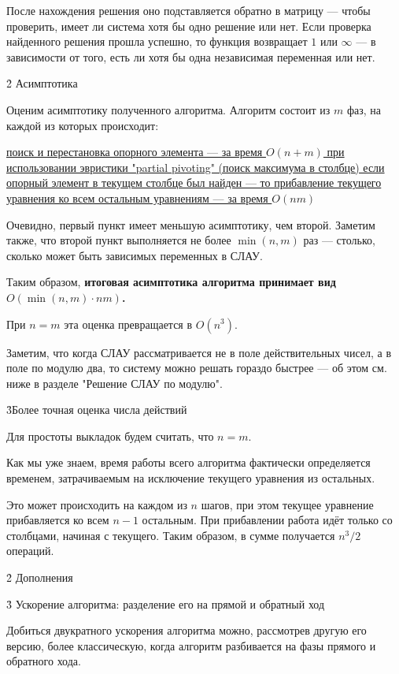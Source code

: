 После нахождения решения оно подставляется обратно в матрицу --- чтобы проверить, имеет ли система хотя бы одно решение или нет. Если проверка найденного решения прошла успешно, то функция возвращает $1$ или $\infty$ --- в зависимости от того, есть ли хотя бы одна независимая переменная или нет.



\h2{ Асимптотика }

Оценим асимптотику полученного алгоритма. Алгоритм состоит из $m$ фаз, на каждой из которых происходит:

\ul{
\li поиск и перестановка опорного элемента --- за время $O(n+m)$ при использовании эвристики "partial pivoting" (поиск максимума в столбце)
\li если опорный элемент в текущем столбце был найден --- то прибавление текущего уравнения ко всем остальным уравнениям --- за время $O(nm)$
}

Очевидно, первый пункт имеет меньшую асимптотику, чем второй. Заметим также, что второй пункт выполняется не более $\min(n,m)$ раз --- столько, сколько может быть зависимых переменных в СЛАУ.

Таким образом, \bf{итоговая асимптотика} алгоритма принимает вид $O (\min(n,m) \cdot n m)$.

При $n = m$ эта оценка превращается в $O(n^3)$.

Заметим, что когда СЛАУ рассматривается не в поле действительных чисел, а в поле по модулю два, то систему можно решать гораздо быстрее --- об этом см. ниже в разделе "Решение СЛАУ по модулю".

\h3{Более точная оценка числа действий}

Для простоты выкладок будем считать, что $n = m$.

Как мы уже знаем, время работы всего алгоритма фактически определяется временем, затрачиваемым на исключение текущего уравнения из остальных.

Это может происходить на каждом из $n$ шагов, при этом текущее уравнение прибавляется ко всем $n-1$ остальным. При прибавлении работа идёт только со столбцами, начиная с текущего. Таким образом, в сумме получается $n^3 / 2$ операций.




\h2{ Дополнения }


\h3{ Ускорение алгоритма: разделение его на прямой и обратный ход }

Добиться двукратного ускорения алгоритма можно, рассмотрев другую его версию, более классическую, когда алгоритм разбивается на фазы прямого и обратного хода.


